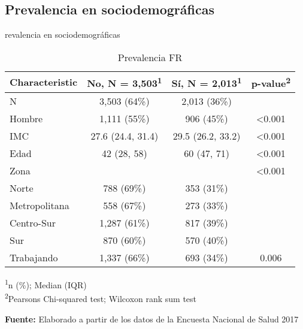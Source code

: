 \documentclass[aspectratio=169]{beamer}
\begin{document}
\subsection*{Prevalencia en sociodemográficas}
\begin{frame}{revalencia en sociodemográficas}
\begin{table}[]
\caption{\small Prevalencia FR}
    \centering
    
    \captionsetup[table]{labelformat=empty,skip=1pt}
\captionsetup[table]{labelformat=empty,skip=1pt}
\begin{tabular}{lccc}
\toprule
\textbf{Characteristic} & \textbf{No}, N = 3,503\textsuperscript{1} & \textbf{Sí}, N = 2,013\textsuperscript{1} & \textbf{p-value}\textsuperscript{2} \\ 
\midrule
N & 3,503 (64\%) & 2,013 (36\%) &  \\ 
\small Hombre & 1,111 (55\%) & 906 (45\%) &  <0.001\\ 
IMC & 27.6 (24.4, 31.4) & 29.5 (26.2, 33.2) & <0.001 \\ 
Edad & 42 (28, 58) & 60 (47, 71) & <0.001 \\ 
Zona &  &  & <0.001 \\ 
\-\hspace{5mm} \small Norte & 788 (69\%) & 353 (31\%) &  \\ 
\-\hspace{5mm} \small Metropolitana & 558 (67\%) & 273 (33\%) &  \\ 
\-\hspace{5mm} \small Centro-Sur & 1,287 (61\%) & 817 (39\%) &  \\ 
\-\hspace{5mm} \small Sur & 870 (60\%) & 570 (40\%) &  \\ 
Trabajando & 1,337 (66\%) & 693 (34\%) & 0.006 \\ 
 \bottomrule
\end{tabular}
\vspace{-5mm}
\begin{minipage}{\linewidth}
\textsuperscript{1}n (\%); Median (IQR) \\ 
\textsuperscript{2}Pearson\textquotesingle{}s Chi-squared test; Wilcoxon rank sum test \\ 
\end{minipage}

    \vspace{1ex}
    
    {\raggedright \small \textbf{Fuente:} Elaborado a partir de los datos de la Encuesta Nacional de Salud 2017 \par}
\end{table}
\end{frame}
\end{document}
